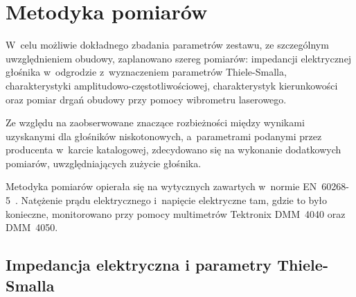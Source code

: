 \documentclass[12pt]{oska}
\begin{document}
	
	\section{Metodyka pomiarów}
	
	W~celu możliwie dokładnego zbadania parametrów zestawu, ze szczególnym uwzględnieniem obudowy, zaplanowano szereg pomiarów: impedancji elektrycznej głośnika w~odgrodzie z~wyznaczeniem parametrów Thiele-Smalla, charakterystyki amplitudowo-częstotliwościowej, charakterystyk kierunkowości oraz pomiar drgań obudowy przy pomocy wibrometru laserowego.
	
	Ze względu na zaobserwowane znaczące rozbieżności między wynikami uzyskanymi dla głośników niskotonowych, a~parametrami podanymi przez producenta w~karcie katalogowej, zdecydowano się na wykonanie dodatkowych pomiarów, uwzględniających zużycie głośnika.
	
	Metodyka pomiarów opierała się na wytycznych zawartych w~normie EN~60268-5~\cite{norma}. Natężenie prądu elektrycznego i~napięcie elektryczne tam, gdzie to było konieczne, monitorowano przy pomocy multimetrów Tektronix DMM~4040 oraz DMM~4050.
	
	\subsection{Impedancja elektryczna i parametry Thiele-Smalla}
	
\end{document}
